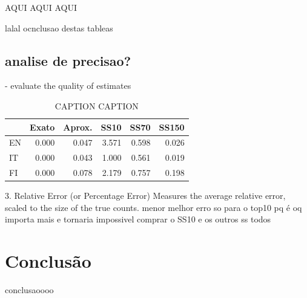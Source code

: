 \documentclass[mirror, portugues]{revdetua}
\begin{document}
AQUI AQUI AQUI

lalal ocnclusao destas tableas

\subsection{analise de precisao?}

- evaluate the quality of estimates


\begin{table}[H]
\centering
\caption{CAPTION CAPTION}
\label{table:erro_relativo}
\begin{tabular}{lrrrrr}
\toprule
& Exato & Aprox. & SS10 & SS70 & SS150 \\
\midrule
EN & 0.000 & 0.047 & 3.571 & 0.598 & 0.026 \\
IT & 0.000 & 0.043 & 1.000 & 0.561 & 0.019 \\
FI & 0.000 & 0.078 & 2.179 & 0.757 & 0.198 \\
\bottomrule
\end{tabular}
\end{table}


3. Relative Error (or Percentage Error)
Measures the average relative error, scaled to the size of the true counts.
menor melhor
erro so para o top10 pq é oq importa mais e tornaria impossivel comprar o SS10 e os outros ss todos


\section{Conclusão}

conclusaoooo


\end{document}
